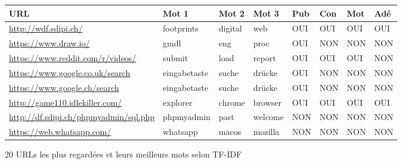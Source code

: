 \begin{figure}
\centering
\caption{20 URLs les plus regardées et leurs meilleurs mots selon TF-IDF}
\label{table-tfidf}
\begin{tabular}{llllllll}
\textbf{URL}                                          & \textbf{Mot 1}  & \textbf{Mot 2}           & \textbf{Mot 3} & \textbf{Pub}           & \textbf{Con}            & \textbf{Mot}               & \textbf{Adé}            \\ \hline
\scriptsize \url{http://wdf.sdipi.ch/}                              & footprints      & digital                  & web            & \cellcolor[HTML]{9AFF99}OUI & \cellcolor[HTML]{9AFF99}OUI & \cellcolor[HTML]{9AFF99}OUI & \cellcolor[HTML]{9AFF99}OUI \\
\scriptsize \url{https://www.draw.io/}                                  & gmdl            & eng                      & proc           & \cellcolor[HTML]{9AFF99}OUI & \cellcolor[HTML]{FFCCC9}NON & \cellcolor[HTML]{FFCCC9}NON & \cellcolor[HTML]{FFCCC9}NON \\
\scriptsize \url{https://www.reddit.com/r/videos/}                      & submit          & load                     & report         & \cellcolor[HTML]{9AFF99}OUI & \cellcolor[HTML]{9AFF99}OUI & \cellcolor[HTML]{9AFF99}OUI & \cellcolor[HTML]{FFCCC9}NON \\
\scriptsize \url{https://www.google.co.uk/search}                       & eingabetaste    & suche                    & drücke         & \cellcolor[HTML]{9AFF99}OUI & \cellcolor[HTML]{FFCCC9}NON & \cellcolor[HTML]{FFCCC9}NON & \cellcolor[HTML]{FFCCC9}NON \\
\scriptsize \url{https://www.google.ch/search}                          & eingabetaste    & suche                    & drücke         & \cellcolor[HTML]{9AFF99}OUI & \cellcolor[HTML]{FFCCC9}NON & \cellcolor[HTML]{FFCCC9}NON & \cellcolor[HTML]{FFCCC9}NON \\
\scriptsize \url{http://game110.idlekiller.com/}                        & explorer        & chrome                   & browser        & \cellcolor[HTML]{9AFF99}OUI & \cellcolor[HTML]{9AFF99}OUI & \cellcolor[HTML]{9AFF99}OUI & \cellcolor[HTML]{9AFF99}OUI \\
\scriptsize \url{http://df.sdipi.ch/phpmyadmin/sql.php}                 & phpmyadmin      & past                     & welcome        & \cellcolor[HTML]{FFCCC9}NON & \cellcolor[HTML]{FFCCC9}NON & \cellcolor[HTML]{FFCCC9}NON & \cellcolor[HTML]{FFCCC9}NON \\
\scriptsize \url{https://web.whatsapp.com/}                             & whatsapp        & macos                    & mozilla        & \cellcolor[HTML]{FFCCC9}NON & \cellcolor[HTML]{FFCCC9}NON & \cellcolor[HTML]{FFCCC9}NON & \cellcolor[HTML]{FFCCC9}NON \\

\end{tabular}
\end{figure}
